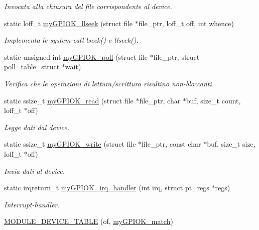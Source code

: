\begin{DoxyCompactItemize}
\begin{DoxyCompactList}\small\item\em Invocata alla chiusura del file corrispondente al device. \end{DoxyCompactList}\item 
static loff\+\_\+t \hyperlink{group___linux-_driver_ga66e7f726b72320a272b633ecbaecefff}{my\+G\+P\+I\+O\+K\+\_\+llseek} (struct file $\ast$file\+\_\+ptr, loff\+\_\+t off, int whence)
\begin{DoxyCompactList}\small\item\em Implementa le system-\/call lseek() e llseek(). \end{DoxyCompactList}\item 
static unsigned int \hyperlink{group___linux-_driver_gaba935e8a8215c2ebce9a7147fd4f5147}{my\+G\+P\+I\+O\+K\+\_\+poll} (struct file $\ast$file\+\_\+ptr, struct poll\+\_\+table\+\_\+struct $\ast$wait)
\begin{DoxyCompactList}\small\item\em Verifica che le operazioni di lettura/scrittura risultino non-\/bloccanti. \end{DoxyCompactList}\item 
static ssize\+\_\+t \hyperlink{group___linux-_driver_ga90ac339df9c02ae5f11a2a7727adc923}{my\+G\+P\+I\+O\+K\+\_\+read} (struct file $\ast$file\+\_\+ptr, char $\ast$buf, size\+\_\+t count, loff\+\_\+t $\ast$off)
\begin{DoxyCompactList}\small\item\em Legge dati dal device. \end{DoxyCompactList}\item 
static ssize\+\_\+t \hyperlink{group___linux-_driver_ga1eea0f6c86e8966ba9b701da57502aad}{my\+G\+P\+I\+O\+K\+\_\+write} (struct file $\ast$file\+\_\+ptr, const char $\ast$buf, size\+\_\+t size, loff\+\_\+t $\ast$off)
\begin{DoxyCompactList}\small\item\em Invia dati al device. \end{DoxyCompactList}\item 
static irqreturn\+\_\+t \hyperlink{group___linux-_driver_ga2fc230a12a97aa63e43b2dc4aec73511}{my\+G\+P\+I\+O\+K\+\_\+irq\+\_\+handler} (int irq, struct pt\+\_\+regs $\ast$regs)
\begin{DoxyCompactList}\small\item\em Interrupt-\/handler. \end{DoxyCompactList}\item 
\hyperlink{group___linux-_driver_gaf33e020610cd80a1cfa2ed79b512b841}{M\+O\+D\+U\+L\+E\+\_\+\+D\+E\+V\+I\+C\+E\+\_\+\+T\+A\+B\+L\+E} (of, \hyperlink{group___linux-_driver_gab59f49dc0fe8d885c73752b8a8163d0e}{my\+G\+P\+I\+O\+K\+\_\+match})

\end{DoxyCompactItemize}
